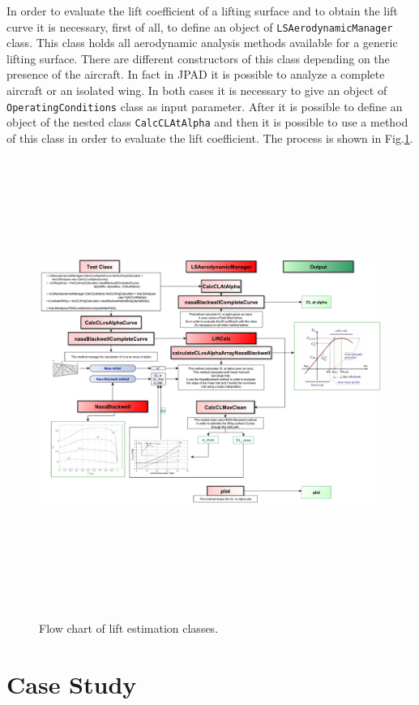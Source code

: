 In order to evaluate the lift coefficient of a lifting surface and to obtain the lift curve it is necessary, first of all, to define an object of \texttt{LSAerodynamicManager} class. This class holds all aerodynamic analysis methods available for a generic lifting surface. There are different constructors of this class depending on the presence of the aircraft. In fact in JPAD it is possible to analyze a complete aircraft or an isolated wing. In both cases it is necessary to give an object of \texttt{OperatingConditions} class as input parameter. After it is possible to define an object of the nested class \texttt{CalcCLAtAlpha} and then it is possible to use a method of this class in order to evaluate the lift coefficient. The process is shown in Fig.\ref{fig:clalf}.

\begin{figure}[H]
\centering
{\includegraphics[height=14.6cm, angle=90]{Immagini/clflowchart.pdf}} 
\caption{Flow chart of lift estimation classes.}
\label{fig:clalf}
\end{figure}


\section{Case Study}

